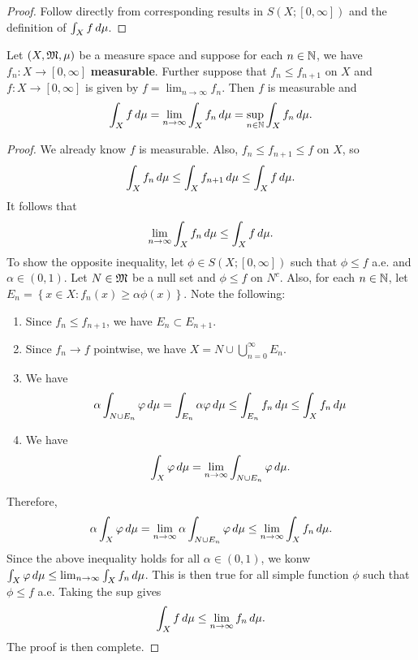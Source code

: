 \documentclass[a4paper]{article}
\renewcommand{\cupinfn}{\bigcup_{n=0}^\infty}
\begin{document}
\begin{proof}
Follow directly from corresponding results in $S(X; [0, \infty])$
and the definition of $\int_X f \, d \mu$.
\end{proof}

\begin{thm}
Let $(X, \mathfrak{M}, \mu)$ be a measure space and suppose for
each $n \in \mathbb{N}$, we have $f_n :
X \to [0, \infty]$ \textbf{measurable}. Further suppose
that $f_n \leq f_{n+1}$ on $X$ and $f: X \to [0, \infty]$
is given by $f = \lim_{n \to \infty} f_n$. Then
$f$ is measurable and
\[
\int_X f \, d \mu = \lim_{n \to \infty} \int_X f_n \, d \mu
= \sup_{n \in \mathbb{N}} \int_X f_n \, d \mu.
\]
\end{thm}

\begin{proof}
We already know $f$ is measurable. Also, $f_n \leq f_{n+1}
\leq f$ on $X$, so
\[
\int_X f_n \, d \mu \leq \int_X f_{n+1} \, d \mu \leq
\int_X f \, d \mu.
\]
It follows that
\[
\lim_{n \to \infty} \int_X f_n \, d \mu \leq \int_X f \, d \mu.
\]
To show the opposite inequality, let
$\phi \in S(X; [0, \infty])$ such that $\phi \leq f$ a.e.
and $\alpha \in (0, 1)$. Let $N \in \mathfrak{M}$ be a null set
and $\phi \leq f$ on $N^c$. Also, for each $n \in \mathbb{N}$, let
$E_n = \left\{ x \in X : f_n(x) \geq \alpha \phi(x) \right\}$.
Note the following:
\begin{enumerate}
  \item Since $f_n \leq f_{n+1}$, we have $E_n \subset E_{n+1}$.
  \item Since $f_n \to f$ pointwise, we have $X = N \cup \cupinfn
  E_n$.
  \item We have
  \[
  \alpha \int_{N \cup E_n} \varphi \, d \mu
  = \int_{E_n} \alpha \varphi \, d \mu
  \leq \int_{E_n} f_n \, d \mu
  \leq \int_X f_n \, d \mu
  \]
  \item We have
  \[
  \int_X \varphi \, d \mu
  = \lim_{n \to \infty} \int_{N \cup E_n} \varphi \, d \mu.
  \]
\end{enumerate}
Therefore,
\[
\alpha \int_X \varphi \, d \mu
= \lim_{n \to \infty} \alpha \int_{N \cup E_n} \varphi \, d \mu
\leq \lim_{n \to \infty} \int_X f_n \, d \mu.
\]
Since the above inequality holds for all $\alpha \in (0, 1)$,
we konw $\int_X \varphi \, d \mu \leq \lim_{n \to \infty}
\int_X f_n \, d \mu$. This is then true for all simple function
$\phi$ such that $\phi \leq f$ a.e. Taking the sup
gives
\[
\int_X f \, d \mu \leq \lim_{n \to \infty} f_n \, d \mu.
\]
The proof is then complete.
\end{proof}
\end{document}
